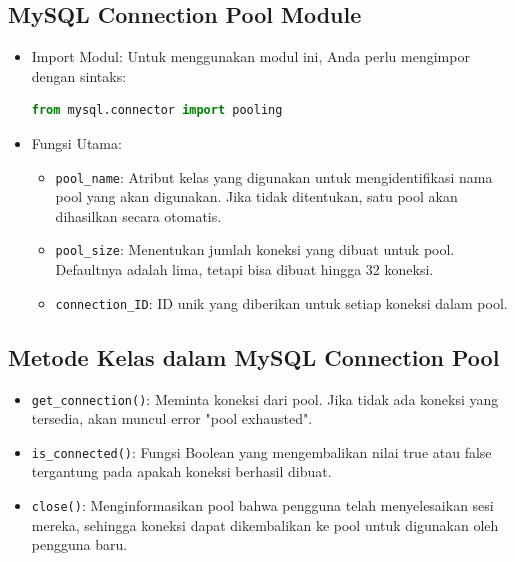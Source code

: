 \documentclass{article}
\begin{document}
\subsection{MySQL Connection Pool Module}
\begin{itemize}
      \item Import Modul: Untuk menggunakan modul ini, Anda perlu mengimpor dengan sintaks:
            \begin{lstlisting}[language=Python, caption={}, captionpos=b]
from mysql.connector import pooling
\end{lstlisting}
      \item Fungsi Utama:
            \begin{itemize}
                  \item \verb|pool_name|: Atribut kelas yang digunakan untuk mengidentifikasi nama pool yang akan digunakan. Jika tidak ditentukan, satu pool akan dihasilkan secara otomatis.
                  \item \verb|pool_size|: Menentukan jumlah koneksi yang dibuat untuk pool. Defaultnya adalah lima, tetapi bisa dibuat hingga 32 koneksi.
                  \item \verb|connection_ID|: ID unik yang diberikan untuk setiap koneksi dalam pool.
            \end{itemize}
\end{itemize}

\subsection{Metode Kelas dalam MySQL Connection Pool}
\begin{itemize}
      \item \verb|get_connection()|: Meminta koneksi dari pool. Jika tidak ada koneksi yang tersedia, akan muncul error "pool exhausted".
      \item \verb|is_connected()|: Fungsi Boolean yang mengembalikan nilai true atau false tergantung pada apakah koneksi berhasil dibuat.
      \item \verb|close()|: Menginformasikan pool bahwa pengguna telah menyelesaikan sesi mereka, sehingga koneksi dapat dikembalikan ke pool untuk digunakan oleh pengguna baru.
\end{itemize}
\end{document}
